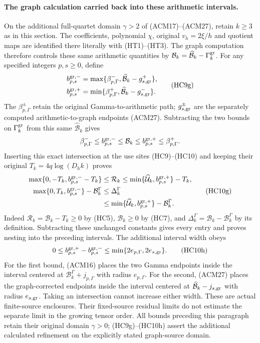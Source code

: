 \paragraph{The graph calculation carried back into these arithmetic intervals.}
On the additional full-quartet domain $\gamma>2$ of (ACM17)--(ACM27),
retain $k\geq3$ as in this section. The coefficients, polynomial
$\chi$, original $v_h=2\xi/h$ and quotient maps are identified
there literally with (HT1)--(HT3). The graph computation therefore
controls these same arithmetic quantities by
$\mathcal B_k=\widehat{\mathcal B}_k-\Gamma_k^{\rm gr}$.
For any specified integers $p,s\geq0$, define
\[
 \begin{aligned}
 b_{p,s}^{\rm gr,-}
 &=\max\{\beta_{p,\Gamma}^-,
                     \widehat{\mathcal B}_k-g_{s,\rm gr}^+\},\\
 b_{p,s}^{\rm gr,+}
 &=\min\{\beta_{p,\Gamma}^+,
                     \widehat{\mathcal B}_k-g_{s,\rm gr}^-\}.
 \end{aligned}
 \tag{HC9g}
\]
The $\beta_{p,\Gamma}^{\pm}$ retain the original
Gamma-to-arithmetic path; $g_{s,\rm gr}^{\pm}$ are the separately
computed arithmetic-to-graph endpoints (ACM27). Subtracting the
two bounds on $\Gamma_k^{\rm gr}$ from this same
$\widehat{\mathcal B}_k$ gives
\[
 \beta_{p,\Gamma}^-\leq b_{p,s}^{\rm gr,-}
 \leq\mathcal B_k\leq b_{p,s}^{\rm gr,+}
 \leq\beta_{p,\Gamma}^+.
\]
Inserting this exact intersection at the use sites (HC9)--(HC10)
and keeping their original $T_k=4q\log(D_hk)$ proves
\[
 \begin{aligned}
 \max\{0,-T_k,b_{p,s}^{\rm gr,-}-T_k\}
 &\leq\mathcal R_k
 \leq\min\{\widehat{\mathcal U}_k,b_{p,s}^{\rm gr,+}\}-T_k,\\
 \max\{0,T_k,b_{p,s}^{\rm gr,-}\}-\mathcal B_k^\Gamma
 &\leq\Delta_k^\Gamma\\
 &\leq\min\{\widehat{\mathcal U}_k,b_{p,s}^{\rm gr,+}\}
                                      -\mathcal B_k^\Gamma.
 \end{aligned}
 \tag{HC10g}
\]
Indeed $\mathcal R_k=\mathcal B_k-T_k\geq0$ by (HC5),
$\mathcal B_k\geq0$ by (HC7), and
$\Delta_k^\Gamma=\mathcal B_k-\mathcal B_k^\Gamma$ by its
definition. Subtracting these unchanged constants gives every
entry and proves nesting into the preceding intervals. The
additional interval width obeys
\[
 0\leq b_{p,s}^{\rm gr,+}-b_{p,s}^{\rm gr,-}
       \leq\min\{2e_{p,\Gamma},2e_{s,\rm gr}\}.
 \tag{HC10h}
\]
For the first bound, (ACM16) places the two Gamma endpoints
inside the interval centered at
$\mathcal B_k^\Gamma+j_{p,\Gamma}$ with radius $e_{p,\Gamma}$.
For the second, (ACM27) places the graph-corrected endpoints
inside the interval centered at
$\widehat{\mathcal B}_k-j_{s,\rm gr}$ with radius $e_{s,\rm gr}$.
Taking an intersection cannot increase either width. These are
actual finite-source enclosures. Their fixed-source residual
limits do not estimate the separate limit in the growing tensor
order. All bounds preceding this paragraph retain their original
domain $\gamma>0$; (HC9g)--(HC10h) assert the additional calculated
refinement on the explicitly stated graph-source domain.


